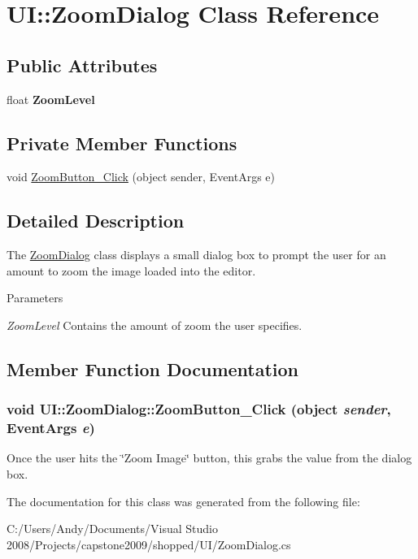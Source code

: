 \hypertarget{class_u_i_1_1_zoom_dialog}{
\section{UI::ZoomDialog Class Reference}
\label{class_u_i_1_1_zoom_dialog}
}
\subsection*{Public Attributes}
\begin{DoxyCompactItemize}
\item 
\hypertarget{class_u_i_1_1_zoom_dialog_a99f9c71d0231478132d8f0c4c708d4b1}{
float {\bfseries ZoomLevel}}
\label{class_u_i_1_1_zoom_dialog_a99f9c71d0231478132d8f0c4c708d4b1}

\end{DoxyCompactItemize}
\subsection*{Private Member Functions}
\begin{DoxyCompactItemize}
\item 
void \hyperlink{class_u_i_1_1_zoom_dialog_a37e75e75f95e892bfcaa225107d5f0f7}{ZoomButton\_\-Click} (object sender, EventArgs e)
\end{DoxyCompactItemize}


\subsection{Detailed Description}
The \hyperlink{class_u_i_1_1_zoom_dialog}{ZoomDialog} class displays a small dialog box to prompt the user for an amount to zoom the image loaded into the editor.


\begin{DoxyParams}{Parameters}
\item[{\em ZoomLevel}]Contains the amount of zoom the user specifies. \end{DoxyParams}


\subsection{Member Function Documentation}
\hypertarget{class_u_i_1_1_zoom_dialog_a37e75e75f95e892bfcaa225107d5f0f7}{
\subsubsection[{ZoomButton\_\-Click}]{\setlength{\rightskip}{0pt plus 5cm}void UI::ZoomDialog::ZoomButton\_\-Click (object {\em sender}, \/  EventArgs {\em e})}}
\label{class_u_i_1_1_zoom_dialog_a37e75e75f95e892bfcaa225107d5f0f7}
Once the user hits the \char`\"{}Zoom Image\char`\"{} button, this grabs the value from the dialog box. 

The documentation for this class was generated from the following file:\begin{DoxyCompactItemize}
\item 
C:/Users/Andy/Documents/Visual Studio 2008/Projects/capstone2009/shopped/UI/ZoomDialog.cs\end{DoxyCompactItemize}
